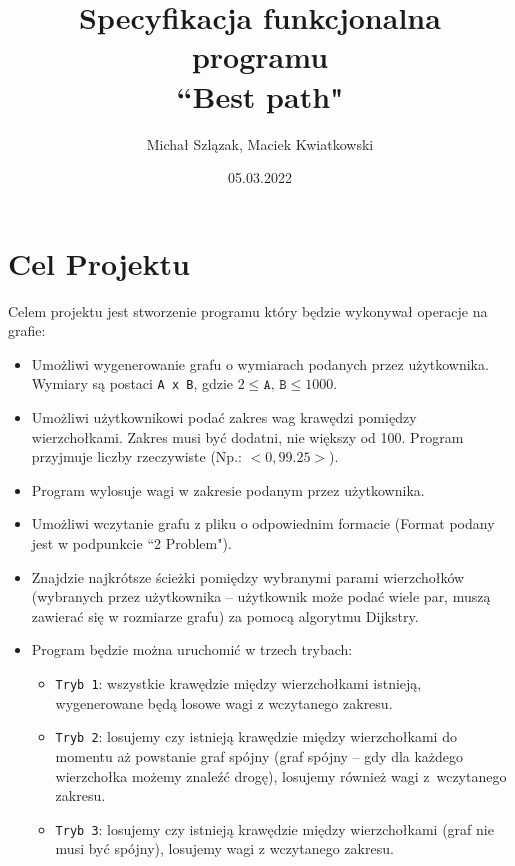 \documentclass[12pt, a4paper]{article}
\begin{document}
\title{Specyfikacja funkcjonalna programu \\ ``Best path"}
\date{05.03.2022}
\author{Michał Szlązak, Maciek Kwiatkowski}
\maketitle
\tableofcontents
\thispagestyle{empty}
\cleardoublepage

\newpage
\setcounter{page}{1}

\section{Cel Projektu}

Celem projektu jest stworzenie programu który będzie wykonywał operacje na grafie:

\begin{itemize}
\item Umożliwi wygenerowanie grafu o wymiarach podanych przez użytkownika. Wymiary są postaci \texttt{A x B}, gdzie $2 \leq \texttt{A, B} \leq 1000$.
\item Umożliwi użytkownikowi podać zakres wag krawędzi pomiędzy wierzchołkami. Zakres musi być dodatni, nie większy od 100. Program przyjmuje liczby rzeczywiste (Np.: $<0, 99.25>$). 
\item Program wylosuje wagi w zakresie podanym przez użytkownika.
\item Umożliwi wczytanie grafu z pliku o odpowiednim formacie (Format podany jest w podpunkcie ``2 Problem").
\item Znajdzie najkrótsze ścieżki pomiędzy wybranymi parami wierzchołków (wybranych przez użytkownika -- użytkownik może podać wiele par, muszą zawierać się w rozmiarze grafu) za pomocą algorytmu Dijkstry.
\item Program będzie można uruchomić w trzech trybach:
\begin{itemize}
    \item \texttt{Tryb 1}: wszystkie krawędzie między wierzchołkami istnieją, 		wygenerowane będą losowe wagi z wczytanego zakresu.
	\item \texttt{Tryb 2}: losujemy czy istnieją krawędzie między wierzchołkami do momentu aż powstanie graf spójny (graf spójny – gdy dla każdego wierzchołka możemy znaleźć drogę), losujemy również wagi z~wczytanego zakresu.
	\item \texttt{Tryb 3}: losujemy czy istnieją krawędzie między wierzchołkami (graf nie musi być spójny), losujemy wagi z wczytanego zakresu.
\end{itemize}


\end{itemize}
\end{document}
